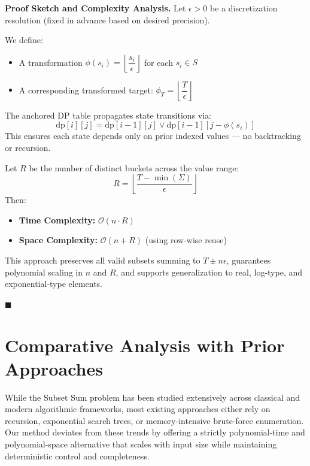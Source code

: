 \documentclass[11pt]{article}
\begin{document}
\bigskip

\textbf{Proof Sketch and Complexity Analysis.}
Let $\epsilon > 0$ be a discretization resolution (fixed in advance based on desired precision).

We define:
\begin{itemize}
    \item A transformation $\phi(s_i) = \left\lfloor \dfrac{s_i}{\epsilon} \right\rfloor$ for each $s_i \in S$
    \item A corresponding transformed target: $\phi_T = \left\lfloor \dfrac{T}{\epsilon} \right\rfloor$
\end{itemize}

The anchored DP table propagates state transitions via:
\[
\text{dp}[i][j] = \text{dp}[i-1][j] \lor \text{dp}[i-1][j - \phi(s_i)]
\]
This ensures each state depends only on prior indexed values — no backtracking or recursion.

Let $R$ be the number of distinct buckets across the value range:
\[
R = \left\lfloor \dfrac{T - \min(\Sigma)}{\epsilon} \right\rfloor
\]
Then:
\begin{itemize}
    \item \textbf{Time Complexity:} $\mathcal{O}(n \cdot R)$
    \item \textbf{Space Complexity:} $\mathcal{O}(n + R)$ \quad (using row-wise reuse)
\end{itemize}

This approach preserves all valid subsets summing to $T \pm n\epsilon$, guarantees polynomial scaling in $n$ and $R$, and supports generalization to real, log-type, and exponential-type elements.

\hfill $\blacksquare$


\vspace{1em}

\section{Comparative Analysis with Prior Approaches}

While the Subset Sum problem has been studied extensively across classical and modern algorithmic frameworks, most existing approaches either rely on recursion, exponential search trees, or memory-intensive brute-force enumeration. Our method deviates from these trends by offering a strictly polynomial-time and polynomial-space alternative that scales with input size while maintaining deterministic control and completeness.
\end{document}
